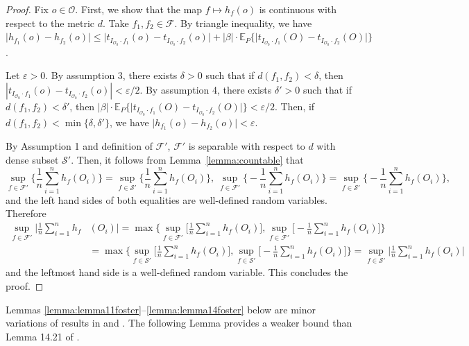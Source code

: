 \documentclass[twoside,11pt]{article}
\newcommand{\E}{\mathbb{E}}
\newcommand{\mc}{\mathcal}
\begin{document}
\begin{proof} Fix $o\in\mc{O}$. First, we show that the map $f\mapsto h_f(o)$ is continuous with respect to the metric $d$. Take $f_1,f_2\in\mc{F}$. By triangle inequality, we have $ \vert h_{f_1}(o)-h_{f_2}(o)\vert\le \vert t_{I_{\mc{O}_0}\cdot f_1}(o)-t_{I_{\mc{O}_0}\cdot f_2}(o)\vert +|\beta|\cdot\E_P\{\vert  t_{I_{\mc{O}_0}\cdot f_1}(O)-t_{I_{\mc{O}_0}\cdot f_2}(O)\vert\}$.

Let $\varepsilon>0$. By assumption 3, there exists $\delta>0$ such that if $d(f_1,f_2)<\delta$, then $\left\vert t_{I_{\mc{O}_0}\cdot f_1}(o)-t_{I_{\mc{O}_0}\cdot f_2}(o)\right\vert <\varepsilon/2$. By assumption 4, there exists $\delta'>0$ such that  if $d(f_1,f_2)<\delta'$, then $|\beta|\cdot\E_P\{\vert  t_{I_{\mc{O}_0}\cdot f_1}(O)-t_{I_{\mc{O}_0}\cdot f_2}(O)\vert\}<\varepsilon/2$. Then, if $d(f_1,f_2)<\min\{\delta,\delta'\}$, we have $ \vert h_{f_1}(o)-h_{f_2}(o)\vert<\varepsilon$.

By Assumption 1 and definition of $\mc{F}'$, 
$\mc{F}'$ is separable with respect to $d$ with dense subset $\mc{S}'$. Then, it follows from Lemma~\ref{lemma:countable} that 
\[
\sup_{f\in \mc{F}'} \Big\{\frac{1}{n}\sum_{i=1}^nh_f(O_i) \Big\}
= \sup_{f \in \mc{S}'} \Big\{\frac{1}{n}\sum_{i=1}^nh_f(O_i) \Big\},\: \sup_{f\in \mc{F}'} \Big\{-\frac{1}{n}\sum_{i=1}^nh_f(O_i) \Big\}
= \sup_{f \in \mc{S}'} \Big\{-\frac{1}{n}\sum_{i=1}^nh_f(O_i) \Big\},
\]
and the left hand sides of both equalities are well-defined random variables. Therefore
\begin{align*}
    \sup_{f\in \mc{F}'} \Big\vert\frac{1}{n}\sum_{i=1}^nh_f&(O_i) \Big\vert = \max\Bigg\{\sup_{f\in \mc{F}'} \Big[\frac{1}{n}\sum_{i=1}^nh_f(O_i) \Big],\sup_{f\in \mc{F}'} \Big[-\frac{1}{n}\sum_{i=1}^nh_f(O_i) \Big]\Bigg\}
    \\
    &=\max\Bigg\{\sup_{f\in \mc{S}'} \Big[\frac{1}{n}\sum_{i=1}^nh_f(O_i) \Big],\sup_{f\in \mc{S}'} \Big[-\frac{1}{n}\sum_{i=1}^nh_f(O_i) \Big]\Bigg\}=\sup_{f\in \mc{S}'} \Big\vert\frac{1}{n}\sum_{i=1}^nh_f(O_i) \Big\vert
\end{align*}
and the leftmost hand side is a well-defined random variable. This concludes the proof.
\end{proof}

Lemmas \ref{lemma:lemma11foster}--\ref{lemma:lemma14foster} below are minor variations of results in \cite{wainwright2019high} and  \cite{foster2023orthogonal}. The following Lemma provides a weaker bound than Lemma 14.21 of \cite{wainwright2019high}. 
\end{document}
